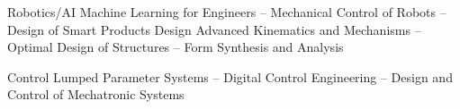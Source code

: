 

\begin{cvskills}

	\cvskill
		{Robotics/AI} %
		{Machine Learning for Engineers -- Mechanical Control of Robots -- Design of Smart Products} %
  \cvskill
    {Design} %
    {Advanced Kinematics and Mechanisms -- Optimal Design of Structures -- Form Synthesis and Analysis} %

  \cvskill
    {Control} %
    {Lumped Parameter Systems -- Digital Control Engineering -- Design and Control of Mechatronic Systems} %
    


\end{cvskills}

